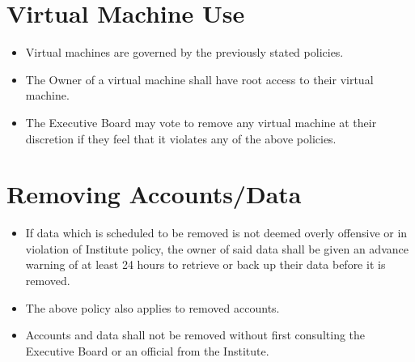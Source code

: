 \section{Virtual Machine Use}
\begin{itemize}
\item Virtual machines are governed by the previously stated policies.
\item The Owner of a virtual machine shall have root access to their virtual machine.
\item The Executive Board may vote to remove any virtual machine at their discretion if they feel that it violates any of the above policies.
\end{itemize}

\section{Removing Accounts/Data}
\begin{itemize}
\item If data which is scheduled to be removed is not deemed overly offensive or in violation of Institute policy, the owner of said data shall be given an advance warning of at least 24 hours to retrieve or back up their data before it is removed.
\item The above policy also applies to removed accounts.
\item Accounts and data shall not be removed without first consulting the Executive Board or an official from the Institute.
\end{itemize}


